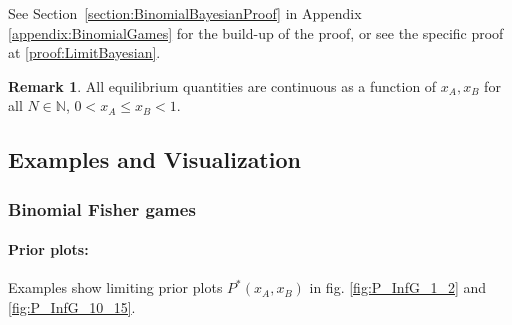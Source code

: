 \documentclass{article}
\theoremstyle{definition}
\newtheorem*{remark}{Remark}
\begin{document}
See Section~\ref{section:BinomialBayesianProof} in Appendix \ref{appendix:BinomialGames} for the build-up of the proof, or see the specific proof at \ref{proof:LimitBayesian}.

\begin{remark}
    All equilibrium quantities are continuous as a function of $x_A,x_B$ for all $N \in \mathbb{N}$,  $0<x_A \le x_B<1$.
    
\end{remark}


\subsection{Examples and Visualization}

\subsubsection{Binomial Fisher games}

\paragraph{Prior plots:} Examples show limiting prior plots $P^*(x_A,x_B)$ in fig. \ref{fig:P_InfG_1_2} and \ref{fig:P_InfG_10_15}.
\end{document}

